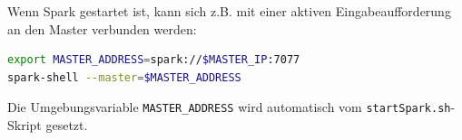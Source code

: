 Wenn Spark gestartet ist, kann sich z.B. mit einer aktiven Eingabeaufforderung an den Master verbunden werden:
\begin{lstlisting}[language=bash]
export MASTER_ADDRESS=spark://$MASTER_IP:7077
spark-shell --master=$MASTER_ADDRESS
\end{lstlisting}\vspace{-1.5\baselineskip}
Die Umgebungsvariable \lstinline!MASTER_ADDRESS! wird automatisch vom \lstinline!startSpark.sh!-Skript \cite{scaromare} gesetzt.
